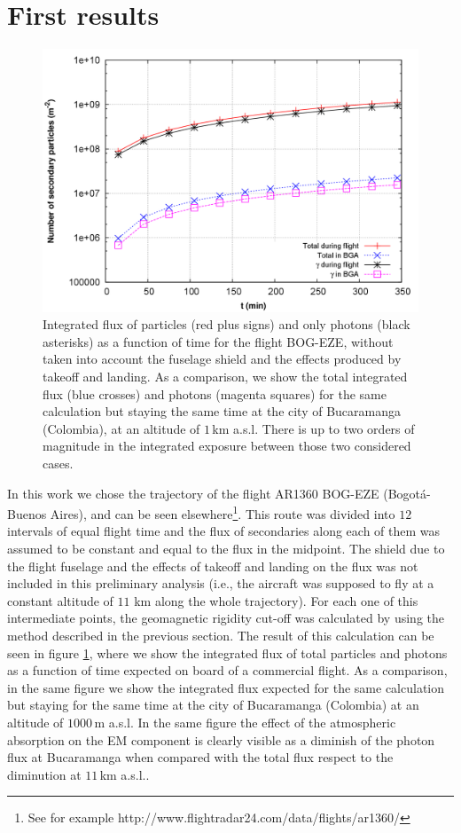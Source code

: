 \documentclass[3p,times,twocolumn]{elsarticle}
\begin{document}
\section{First results}\label{sec:first_results}

\begin{figure}[t!]
\centering
\includegraphics[scale=.14]{figures/g4_dosetime.png}
\caption{Integrated flux of particles (red plus signs) and only photons (black
	asterisks) as a function of time for the flight BOG-EZE, without taken into
	account the fuselage shield and the effects produced by takeoff and
	landing. As a comparison, we show the total integrated flux (blue crosses)
	and photons (magenta squares) for the same calculation but staying the same
	time at the city of Bucaramanga (Colombia), at an altitude of $1$\,km
	a.s.l. There is up to two orders of magnitude in the integrated exposure
	between those two considered cases.}
\label{fig:integrated_bta_bsas}
\end{figure}

In this work we chose the trajectory of the flight AR1360 BOG-EZE
(Bogot\'a-Buenos Aires), and can be seen elsewhere\footnote{See for example
http://www.flightradar24.com/data/flights/ar1360/}. This route was divided into
$12$ intervals of equal flight time and the flux of secondaries along each of
them was assumed to be constant and equal to the flux in the midpoint. The
shield due to the flight fuselage and the effects of takeoff and landing on the
flux was not included in this preliminary analysis (i.e., the aircraft was
supposed to fly at a constant altitude of $11$ km along the whole trajectory).
For each one of this intermediate points, the geomagnetic rigidity cut-off was
calculated by using the method described in the previous section. The result of
this calculation can be seen in figure \ref{fig:integrated_bta_bsas}, where
we show the integrated flux of total particles and photons as a function of
time expected on board of a commercial flight. As a comparison, in the same
figure we show the integrated flux expected for the same calculation but
staying for the same time at the city of Bucaramanga (Colombia) at an altitude
of $1000$\,m a.s.l. In the same figure the effect of the atmospheric absorption
on the EM component is clearly visible as a diminish of the photon flux at
Bucaramanga when compared with the total flux respect to the diminution at
$11$\,km a.s.l..  
\end{document}
